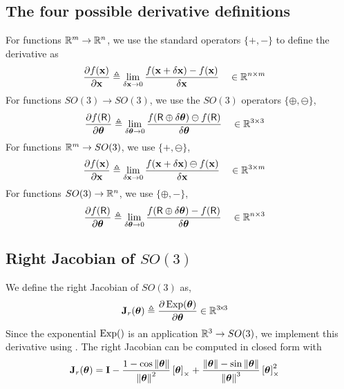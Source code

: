 \subsection{The four possible derivative definitions}

For functions ${\mathbb R}^m\to{\mathbb R}^n$, we use the standard operators $\{+,-\}$ to define the derivative as
%
\begin{align}
\frac{\partial f({\bf x})}{\partial{\bf x}} &\triangleq \lim_{\delta{\bf x}\to0}\frac{f({\bf x}+\delta{\bf x})-f({\bf x})}{\delta{\bf x}} &&\in {\mathbb R}^{n\times m} \label{equ:derivative_vector}
\end{align}
%
For functions $SO(3)\to SO(3)$, we use the $SO(3)$ operators $\{\oplus,\ominus\}$,
%
\begin{align}
\frac{\partial f(\mathsf R)}{\partial{{\bm \theta}}} 
&\triangleq \lim_{\delta{{\bm \theta}}\to0}\frac{f(\mathsf R\oplus\delta{{\bm \theta}})\ominus f(\mathsf R)}{\delta{{\bm \theta}}}  && \in {\mathbb R}^{3\times 3}
\label{equ:derivative_SO3}
\end{align}
%
For functions ${\mathbb R}^m \to SO(3)$, we use $\{+,\ominus\}$,
%
\begin{align}
\frac{\partial f({\bf x})}{\partial{\bf x}} &\triangleq \lim_{\delta{\bf x}\to0} \frac{ f({\bf x}+\delta{\bf x})\ominus f({\bf x})}{\delta{\bf x}} && \in {\mathbb R}^{3\times m} \label{equ:dif_RtoSO3}
\end{align}
%
For functions $SO(3)\to{\mathbb R}^n$, we use $\{\oplus,-\}$,
%
\begin{align}
\frac{\partial f(\mathsf R)}{\partial{{\bm \theta}}} &\triangleq \lim_{\delta{{\bm \theta}}\to0} \frac{f(\mathsf R\oplus\delta{{\bm \theta}}) - f(\mathsf R)}{\delta{{\bm \theta}}} && \in {\mathbb R}^{n\times 3} \label{equ:jacobian_SO3_Rn}
\end{align}



\subsection{Right Jacobian of $SO(3)$ }

We define the right Jacobian of $SO(3)$ as, 
%
\begin{align}\label{equ:Jr}
{\bf J}_r({{\bm \theta}}) &\triangleq \frac{\partial\operatorname*{Exp}({{\bm \theta}})}{\partial{{\bm \theta}}} 
\in{\mathbb R}^{3\!\times\!3}
\end{align}
%
Since the exponential $\operatorname*{Exp}()$ is an application ${\mathbb R}^3\to SO(3)$,
we implement this derivative using .
The right Jacobian 
can be computed in closed form with \cite[pag.~40]{CHIRIKJIAN-12}
%
\begin{align}
{\bf J}_r({{\bm \theta}}) &= {\bf I} - \frac{1-\cos{\left\|{{\bm \theta}}\right\|}}{{\left\|{{\bm \theta}}\right\|}^2}\left[{{\bm \theta}}\right]_\times + \frac{{\left\|{{\bm \theta}}\right\|}-\sin{\left\|{{\bm \theta}}\right\|}}{{\left\|{{\bm \theta}}\right\|}^3}\left[{{\bm \theta}}\right]_\times^2 
\end{align}






